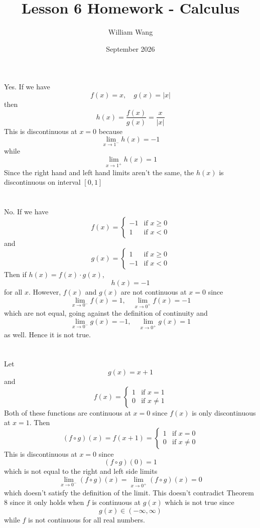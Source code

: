 \documentclass{article}
\title{Lesson 6 Homework - Calculus}
\author{William Wang}
\date{September 2026}
\begin{document}
\maketitle

\section{}
Yes. If we have 
\[f(x) = x, \quad g(x) = |x|\]
then  
\[h(x) = \frac{f(x)}{g(x)} = \frac{x}{|x|}\]
This is discontinuous at \(x=0\) because 
\[\lim_{x\to 1^-} h(x) = -1\]
while 
\[\lim_{x\to1^+}h(x) = 1\]
Since the right hand and left hand limits aren't the same, the \(h(x)\) is discontinuous on interval \([0,1]\)

\section{}
No. If we have 
\[f(x) = \begin{cases}
    -1 & \text{if } x \geq 0 
    \\ 1 & \text{if } x < 0
\end{cases}\]
and 
\[g(x) = \begin{cases}
    1 & \text{if } x \geq 0
    \\ -1 & \text{if } x < 0
\end{cases}\]
Then if \(h(x) = f(x) \cdot g(x)\), 
\[h(x) = -1\]
for all \(x\). However, \(f(x)\) and \(g(x)\) are not continuous at \(x = 0\) since 
\[\lim_{x\to 0^-} f(x) = 1, \quad \lim_{x\to0^+}f(x) = -1\]
which are not equal, going against the definition of continuity and 
\[\lim_{x\to0^-} g(x) = -1, \quad \lim_{x\to0^+} g(x) = 1\]
as well. Hence it is not true. 

\section{}
Let 
\[g(x) = x+1\]
and 
\[f(x) = \begin{cases}
    1 & \text{if } x = 1
    \\ 0 & \text{if } x \neq 1
\end{cases}\]
Both of these functions are continuous at \(x= 0\) since \(f(x)\) is only discontinuous at \(x=1\). Then 
\[(f\circ g)(x) = f(x+1) = \begin{cases}
    1 & \text{if } x = 0
    \\ 0 & \text{if } x \neq 0
\end{cases}\]
This is discontinuous at \(x = 0\) since 
\[(f\circ g)(0) = 1\]
which is not equal to the right and left side limits 
\[\lim_{x\to 0^-} (f\circ g)(x) = \lim_{x\to 0^+} (f\circ g)(x) = 0\]
which doesn't satisfy the definition of the limit. This doesn't contradict Theorem 8 since it only holds when \(f\) is continuous at \(g(x)\) which is not true since 
\[g(x) \in (-\infty, \infty)\]
while \(f\) is not continuous for all real numbers. 
\end{document}
